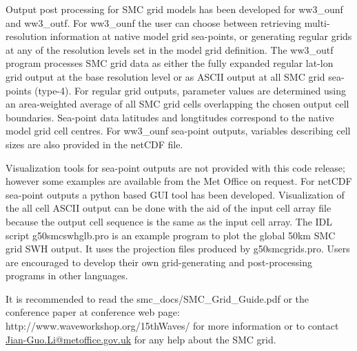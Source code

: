 Output post processing for SMC grid models has been developed for
ww3\_ounf and ww3\_outf. For ww3\_ounf the user can choose between
retrieving multi-resolution information at native model grid sea-points,
or generating regular grids at any of the resolution levels set in
the model grid definition. The ww3\_outf program processes SMC grid data
as either the fully expanded regular lat-lon grid output at the base
resolution level or as ASCII output at all SMC grid sea-points (type-4).
For regular grid outputs, parameter values are determined
using an area-weighted average of all SMC grid cells overlapping the chosen
output cell boundaries. Sea-point data latitudes and longtitudes 
correspond to the native model grid cell centres. For ww3\_ounf
sea-point outputs, variables describing cell sizes are also provided
in the netCDF file.

Visualization tools for sea-point outputs are not provided with this
code release; however some examples are available from the Met Office
on request. For netCDF sea-point outputs a python based GUI tool has
been developed. Visualization of the all cell ASCII output can be done
with the aid of the input cell array file because the output cell 
sequence is the same as the input cell array. The IDL script 
g50smcswhglb.pro is an example program to plot the global 50km SMC grid
SWH output. It uses the projection files produced by g50smcgrids.pro. 
Users are encouraged to develop their own grid-generating and 
post-processing programs in other languages.

It is recommended to read the smc\_docs/SMC\_Grid\_Guide.pdf or the
conference paper \citep{tol:LiS17} at conference web page: 
http://www.waveworkshop.org/15thWaves/
for more information or to contact \url{Jian-Guo.Li@metoffice.gov.uk} 
for any help about the SMC grid.

